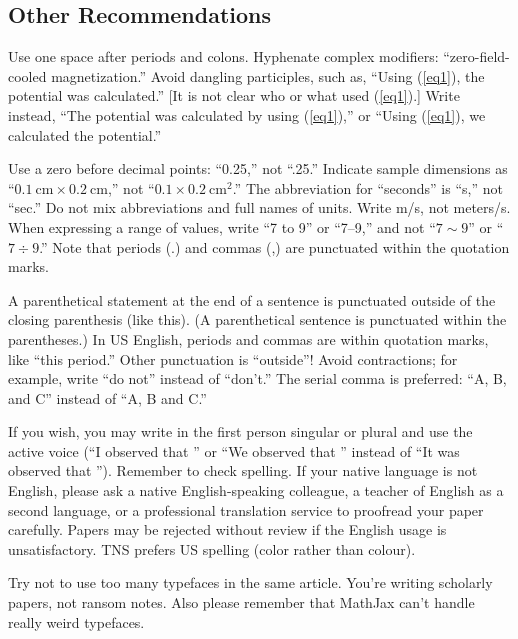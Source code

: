 \documentclass{IEEEtran}
\begin{document}
\subsection{Other Recommendations}
Use one space after periods and colons. Hyphenate complex modifiers:
``zero-field-cooled magnetization.'' Avoid dangling participles, such as,
``Using (\ref{eq1}), the potential was calculated.'' [It is not clear who or what
used (\ref{eq1}).] Write instead, ``The potential was calculated by using (\ref{eq1}),'' or
``Using (\ref{eq1}), we calculated the potential.''

Use a zero before decimal points: ``0.25,'' not ``.25.'' Indicate sample
dimensions as ``$0.1~\text{cm} \times 0.2~\text{cm}$,'' not ``$0.1
\times 0.2~\text{cm}^{2}$.'' The abbreviation for ``seconds'' is ``s,'' not ``sec.'' Do not
mix abbreviations and full names of units. Write m/s, not meters/s. When
expressing a range of values, write ``7 to 9'' or ``7--9,'' and not
``$7\sim9$'' or ``$7\div 9$.'' Note that periods (.) and commas
(,) are punctuated within the quotation marks.

A parenthetical statement at the end of a sentence is punctuated outside of
the closing parenthesis (like this). (A parenthetical sentence is punctuated
within the parentheses.) In US English, periods and commas are within
quotation marks, like ``this period.'' Other punctuation is ``outside''!
Avoid contractions; for example, write ``do not'' instead of ``don't.'' The
serial comma is preferred: ``A, B, and C'' instead of ``A, B and C.''

If you wish, you may write in the first person singular or plural and use
the active voice (``I observed that \textellipsis'' or ``We observed that \textellipsis''
instead of ``It was observed that \textellipsis''). Remember to check spelling. If
your native language is not English, please ask a native English-speaking
colleague, a teacher of English as a second language, or a professional
translation service to proofread your paper carefully. Papers may be
rejected without review if the English usage is unsatisfactory. TNS prefers
US spelling (color rather than colour).

Try not to use too many typefaces in the same article. You're writing
scholarly papers, not ransom notes. Also please remember that MathJax
can't handle really weird typefaces.
\end{document}
